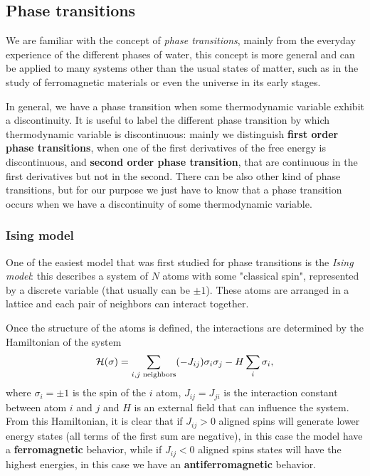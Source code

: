 \subsection{Phase transitions}
We are familiar with the concept of \emph{phase transitions}, mainly from the everyday experience of the different phases of water, this concept is more general and can be applied to many systems other than the usual states of matter, such as in the study of ferromagnetic materials or even the universe in its early stages. 

In general, we have a phase transition when some thermodynamic variable exhibit a discontinuity. It is useful to label the different phase transition by which thermodynamic variable is discontinuous: mainly we distinguish \textbf{first order phase transitions}, when one of the first derivatives of the free energy is discontinuous, and \textbf{second order phase transition}, that are continuous in the first derivatives but not in the second. There can be also other kind of phase transitions, but for our purpose we just have to know that a phase transition occurs when we have a discontinuity of some thermodynamic variable.
\subsubsection{Ising model}
One of the easiest model that was first studied for phase transitions is the \emph{Ising model}: this describes a system of $N$ atoms with some "classical spin", represented by a discrete variable (that usually can be $\pm 1$). These atoms are arranged in a lattice and each pair of neighbors can interact together. 

Once the structure of the atoms is defined, the interactions are determined by the Hamiltonian of the system
\begin{equation}
    \label{Ising_Hamiltonian}
    \mathcal{H}(\sigma)=\sum_{i,j \\ \text{ neighbors}} (-J_{ij})\sigma_i\sigma_j-H\sum_i \sigma_i,
\end{equation}
where $\sigma_i=\pm 1$ is the spin of the $i$ atom, $J_{ij}=J_{ji}$ is the interaction constant between atom $i$ and $j$ and $H$ is an external field that can influence the system. From this Hamiltonian, it is clear that if $J_{ij}>0$ aligned spins will generate lower energy states (all terms of the first sum are negative), in this case the model have a \textbf{ferromagnetic} behavior, while if $J_{ij}<0$ aligned spins states will have the highest energies, in this case we have an \textbf{antiferromagnetic} behavior.

